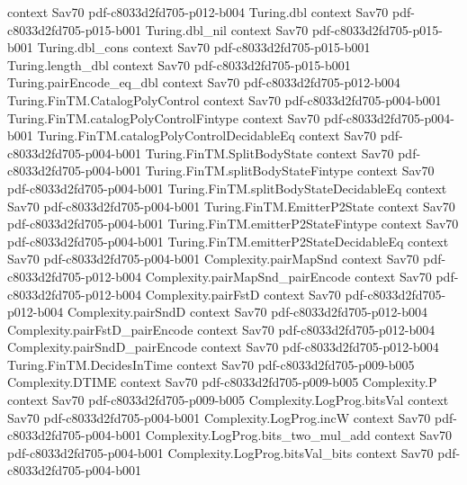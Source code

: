\begin{theorem}
  {context}
  {Sav70}
  {pdf-c8033d2fd705-p012-b004}
\proofstep
  {Turing.dbl}
  {context}
  {Sav70}
  {pdf-c8033d2fd705-p015-b001}
\proofstep
  {Turing.dbl_nil}
  {context}
  {Sav70}
  {pdf-c8033d2fd705-p015-b001}
\proofstep
  {Turing.dbl_cons}
  {context}
  {Sav70}
  {pdf-c8033d2fd705-p015-b001}
\proofstep
  {Turing.length_dbl}
  {context}
  {Sav70}
  {pdf-c8033d2fd705-p015-b001}
\proofstep
  {Turing.pairEncode_eq_dbl}
  {context}
  {Sav70}
  {pdf-c8033d2fd705-p012-b004}
\proofstep
  {Turing.FinTM.CatalogPolyControl}
  {context}
  {Sav70}
  {pdf-c8033d2fd705-p004-b001}
\proofstep
  {Turing.FinTM.catalogPolyControlFintype}
  {context}
  {Sav70}
  {pdf-c8033d2fd705-p004-b001}
\proofstep
  {Turing.FinTM.catalogPolyControlDecidableEq}
  {context}
  {Sav70}
  {pdf-c8033d2fd705-p004-b001}
\proofstep
  {Turing.FinTM.SplitBodyState}
  {context}
  {Sav70}
  {pdf-c8033d2fd705-p004-b001}
\proofstep
  {Turing.FinTM.splitBodyStateFintype}
  {context}
  {Sav70}
  {pdf-c8033d2fd705-p004-b001}
\proofstep
  {Turing.FinTM.splitBodyStateDecidableEq}
  {context}
  {Sav70}
  {pdf-c8033d2fd705-p004-b001}
\proofstep
  {Turing.FinTM.EmitterP2State}
  {context}
  {Sav70}
  {pdf-c8033d2fd705-p004-b001}
\proofstep
  {Turing.FinTM.emitterP2StateFintype}
  {context}
  {Sav70}
  {pdf-c8033d2fd705-p004-b001}
\proofstep
  {Turing.FinTM.emitterP2StateDecidableEq}
  {context}
  {Sav70}
  {pdf-c8033d2fd705-p004-b001}
\proofstep
  {Complexity.pairMapSnd}
  {context}
  {Sav70}
  {pdf-c8033d2fd705-p012-b004}
\proofstep
  {Complexity.pairMapSnd_pairEncode}
  {context}
  {Sav70}
  {pdf-c8033d2fd705-p012-b004}
\proofstep
  {Complexity.pairFstD}
  {context}
  {Sav70}
  {pdf-c8033d2fd705-p012-b004}
\proofstep
  {Complexity.pairSndD}
  {context}
  {Sav70}
  {pdf-c8033d2fd705-p012-b004}
\proofstep
  {Complexity.pairFstD_pairEncode}
  {context}
  {Sav70}
  {pdf-c8033d2fd705-p012-b004}
\proofstep
  {Complexity.pairSndD_pairEncode}
  {context}
  {Sav70}
  {pdf-c8033d2fd705-p012-b004}
\proofstep
  {Turing.FinTM.DecidesInTime}
  {context}
  {Sav70}
  {pdf-c8033d2fd705-p009-b005}
\proofstep
  {Complexity.DTIME}
  {context}
  {Sav70}
  {pdf-c8033d2fd705-p009-b005}
\proofstep
  {Complexity.P}
  {context}
  {Sav70}
  {pdf-c8033d2fd705-p009-b005}
\proofstep
  {Complexity.LogProg.bitsVal}
  {context}
  {Sav70}
  {pdf-c8033d2fd705-p004-b001}
\proofstep
  {Complexity.LogProg.incW}
  {context}
  {Sav70}
  {pdf-c8033d2fd705-p004-b001}
\proofstep
  {Complexity.LogProg.bits_two_mul_add}
  {context}
  {Sav70}
  {pdf-c8033d2fd705-p004-b001}
\proofstep
  {Complexity.LogProg.bitsVal_bits}
  {context}
  {Sav70}
  {pdf-c8033d2fd705-p004-b001}

\end{theorem}
